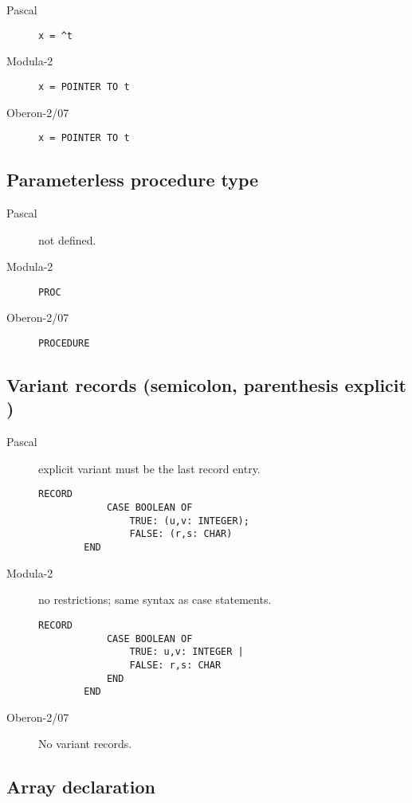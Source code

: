 \documentclass[10pt]{article}
\begin{document}
\begin{description}
    \item[Pascal] \lstinline!x = ^t!
    \item[Modula-2] \lstinline!x = POINTER TO t!
    \item[Oberon-2/07] \lstinline!x = POINTER TO t!
\end{description}

\subsection{Parameterless procedure type}

\begin{description}
    \item[Pascal] not defined.
    \item[Modula-2] \lstinline!PROC!
    \item[Oberon-2/07] \lstinline!PROCEDURE!
\end{description}

\subsection{Variant records (semicolon, parenthesis explicit \END)}

\begin{description}
    \item[Pascal] explicit variant must be the last record entry.
    \begin{lstlisting}[style=example]   
        RECORD
            CASE BOOLEAN OF 
                TRUE: (u,v: INTEGER); 
                FALSE: (r,s: CHAR)  
        END
        \end{lstlisting}
 
    \item[Modula-2] no restrictions; same syntax as case statements.
    \begin{lstlisting}[style=example]   
        RECORD
            CASE BOOLEAN OF 
                TRUE: u,v: INTEGER |
                FALSE: r,s: CHAR
            END 
        END
        \end{lstlisting}
    \item[Oberon-2/07] No variant records.
\end{description}

\subsection{Array declaration}
\end{document}

